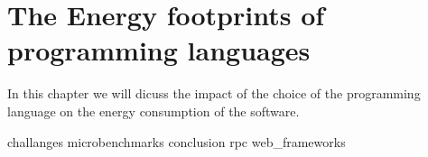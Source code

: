 \newpage

\chapter{The Energy footprints of programming languages}
\label{chapter:porgramming_langauges}
In this chapter we will dicuss the impact of the choice of the programming language on the energy consumption of the software.


{challanges}
{microbenchmarks}
{conclusion}
{rpc}
{web_frameworks}

